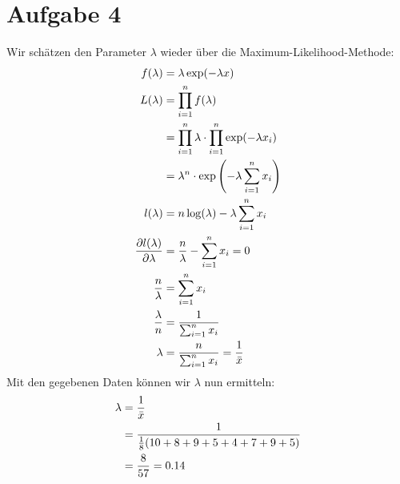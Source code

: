 \documentclass{article}
\begin{document}
	\section*{Aufgabe 4}
	Wir schätzen den Parameter $\lambda$ wieder über die Maximum-Likelihood-Methode:
	\begin{align}
		f(\lambda) &= \lambda\exp(-\lambda x) \notag \\
		L(\lambda) &= \prod_{i=1}^n f(\lambda) \notag \\
		&= \prod_{i=1}^n \lambda \cdot \prod_{i=1}^n \exp(-\lambda x_i) \notag \\
		&= \lambda^n \cdot\exp\left(-\lambda\sum_{i=1}^n x_i\right) \notag \\
		l(\lambda) &= n\log(\lambda) -\lambda\sum_{i=1}^n x_i \notag \\
		\frac{\partial l(\lambda)}{\partial\lambda} &= \frac{n}{\lambda} - \sum_{i=1}^n x_i =0 \notag \\
		\frac{n}{\lambda} &= \sum_{i=1}^n x_i \notag \\
		\frac{\lambda}{n} &= \frac{1}{\sum_{i=1}^n x_i} \notag \\
		\lambda &= \frac{n}{\sum_{i=1}^n x_i} = \frac{1}{\bar{x}} \notag
	\end{align}
	Mit den gegebenen Daten können wir $\lambda$ nun ermitteln:
	\begin{align}
		\lambda &= \frac{1}{\bar{x}} \notag \\
		&= \frac{1}{\frac{1}{8}(10+8+9+5+4+7+9+5)} \notag \\
		&= \frac{8}{57} = 0.14 \notag
	\end{align}
	
\end{document}
